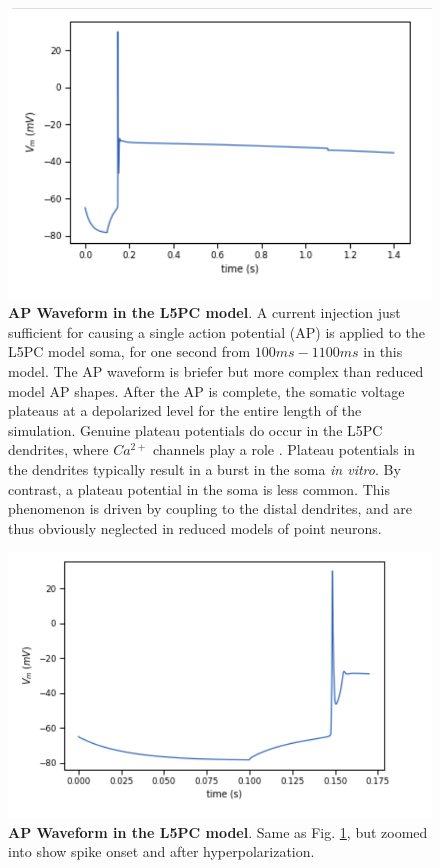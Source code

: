 \begin{figure}
\centering
\includegraphics[scale=0.8]{figures/correct_active_l5pc.png}
\caption[AP Waveform in the L5PC model (A)]{\textbf{AP Waveform in the L5PC model}.
A current injection just sufficient for causing a single action potential (AP) is applied to the L5PC model soma, for one second from $100ms-1100ms$ in this model.
The AP waveform is briefer but more complex than reduced model AP shapes.
After the AP is complete, the somatic voltage plateaus at a depolarized level for the entire length of the simulation.
Genuine plateau potentials do occur in the L5PC dendrites, where $Ca^{2+}$ channels play a role \citep{zhu2000maturation}.
Plateau potentials in the dendrites typically result in a burst in the soma \emph{in vitro}. 
By contrast, a plateau potential in the soma is less common.
This phenomenon is driven by coupling to the distal dendrites, and are thus obviously neglected in reduced models of point neurons.}
\label{fig:l5pc-a}
\end{figure}

\begin{figure}
 \begin{center}
\includegraphics[scale=0.8]{figures/spike_shape.png}
\caption[AP Waveform in the L5PC model (B)]{\textbf{AP Waveform in the L5PC model}.
Same as Fig. \ref{fig:l5pc-a}, but zoomed into show spike onset and after hyperpolarization.}
\label{fig:l5pc-b}
\end{center}
\end{figure}

